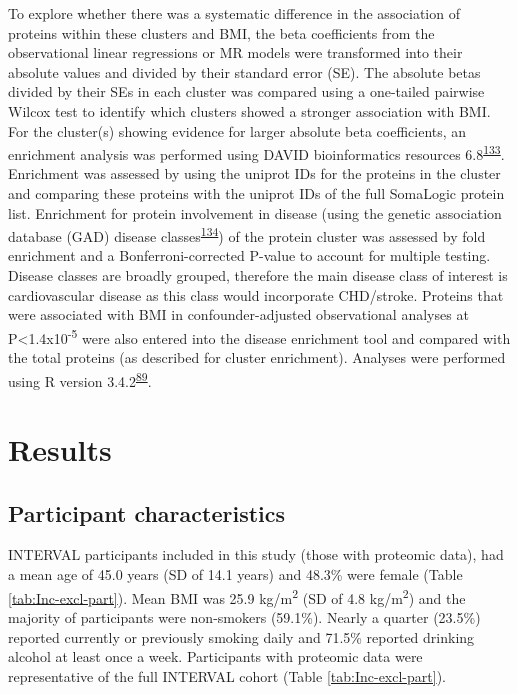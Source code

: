 \documentclass[11pt,twoside]{bristolthesis}
\begin{document}
To explore whether there was a systematic difference in the association of proteins within these clusters and BMI, the beta coefficients from the observational linear regressions or MR models were transformed into their absolute values and divided by their standard error (SE). The absolute betas divided by their SEs in each cluster was compared using a one-tailed pairwise Wilcox test to identify which clusters showed a stronger association with BMI. For the cluster(s) showing evidence for larger absolute beta coefficients, an enrichment analysis was performed using DAVID bioinformatics resources 6.8\textsuperscript{\protect\hyperlink{ref-Huang2009}{133}}. Enrichment was assessed by using the uniprot IDs for the proteins in the cluster and comparing these proteins with the uniprot IDs of the full SomaLogic protein list. Enrichment for protein involvement in disease (using the genetic association database (GAD) disease classes\textsuperscript{\protect\hyperlink{ref-Becker2004a}{134}}) of the protein cluster was assessed by fold enrichment and a Bonferroni-corrected P-value to account for multiple testing. Disease classes are broadly grouped, therefore the main disease class of interest is cardiovascular disease as this class would incorporate CHD/stroke. Proteins that were associated with BMI in confounder-adjusted observational analyses at P\textless1.4x10\textsuperscript{-5} were also entered into the disease enrichment tool and compared with the total proteins (as described for cluster enrichment). Analyses were performed using R version 3.4.2\textsuperscript{\protect\hyperlink{ref-Team2019a}{89}}.

\hypertarget{results-3}{%
\section{Results}\label{results-3}}

\hypertarget{participant-characteristics-1}{%
\subsection{Participant characteristics}\label{participant-characteristics-1}}

INTERVAL participants included in this study (those with proteomic data), had a mean age of 45.0 years (SD of 14.1 years) and 48.3\% were female (Table \ref{tab:Inc-excl-part}). Mean BMI was 25.9 kg/m\textsuperscript{2} (SD of 4.8 kg/m\textsuperscript{2}) and the majority of participants were non-smokers (59.1\%). Nearly a quarter (23.5\%) reported currently or previously smoking daily and 71.5\% reported drinking alcohol at least once a week. Participants with proteomic data were representative of the full INTERVAL cohort (Table \ref{tab:Inc-excl-part}).
\end{document}

